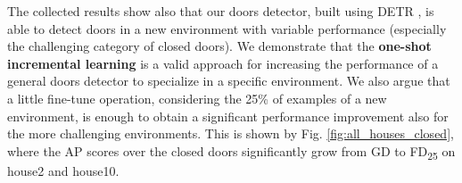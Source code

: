 The collected results show also that our doors detector, built using DETR \cite{detr}, is able to detect doors in a new environment with variable performance (especially the challenging category of closed doors). We demonstrate that the \textbf{one-shot incremental learning} is a valid approach for increasing the performance of a general doors detector to specialize in a specific environment. We also argue that a little fine-tune operation, considering the 25\% of examples of a new environment, is enough to obtain a significant performance improvement also for the more challenging environments. This is shown by Fig. \ref{fig:all_houses_closed}, where the AP scores over the closed doors significantly grow from \textsf{GD} to \textsf{FD\textsubscript{25}} on \textsf{house2} and \textsf{house10}.



